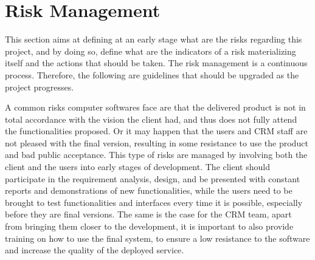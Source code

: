 \documentclass[a4paper]{article}
\begin{document}
\begin{figure}[h]
\centering
\vspace*{\fill}
\noindent{}%
\vspace*{0cm}
\end{figure}
\section{Risk Management}

This section aims at defining at an early stage what are the risks regarding this project, and by doing so, define what are the indicators of a risk materializing itself and the actions that should be taken. The risk management is a continuous process. Therefore, the following are guidelines that should be upgraded as the project progresses. 

A common risks computer softwares face are that the delivered product is not in total accordance with the vision the client had, and thus does not fully attend the functionalities proposed. Or it may happen that the users and CRM staff are not pleased with the final version, resulting in some resistance to use the product and bad public acceptance. This type of risks are managed by involving both the client and the users into early stages of development. The client should participate in the requirement analysis, design, and be presented with constant reports and demonstrations of new functionalities, while the users need to be brought to test functionalities and interfaces every time it is possible, especially before they are final versions. The same is the case for the CRM team, apart from bringing them closer to the development, it is important to also provide training on how to use the final system, to ensure a low resistance to the software and increase the quality of the deployed service.  
\end{document}
